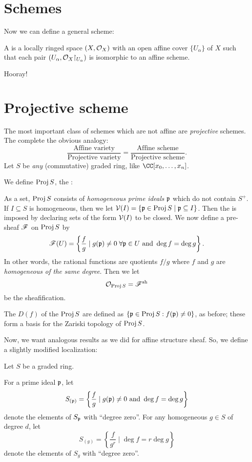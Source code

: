 \documentclass[11pt]{scrreprt}
\begin{document}
\section{Schemes}
Now we can define a general scheme:
\begin{definition}
	A  is a locally ringed space $(X, \mathcal O_X)$
	with an open affine cover $\{U_\alpha\}$ of $X$
	such that each pair $(U_\alpha, \OO_X \restrict{U_\alpha})$
	is isomorphic to an affine scheme.
\end{definition}
Hooray!

\section{Projective scheme}
The most important class of schemes which are not affine are
\emph{projective} schemes.
The complete the obvious analogy:
\[
	\frac{\text{Affine variety}}{\text{Projective variety}}
	= 
	\frac{\text{Affine scheme}}{\text{Projective scheme}}.
\]
Let $S$ be \emph{any} (commutative) graded ring, like $\CC[x_0, \dots, x_n]$.
\begin{definition}
	We define $\operatorname{Proj} S$, the :
	\begin{itemize}
		\ii As a set, $\operatorname{Proj} S$ consists of \emph{homogeneous prime ideals}
		$\mathfrak p$ which do not contain $S^+$.
		\ii If $I \subseteq S$ is homogeneous, then
		we let $\mathcal V(I) = \{ \mathfrak p \in \operatorname{Proj} S \mid \mathfrak p \subseteq I \}$.
		Then the  is imposed by declaring 
		sets of the form $\mathcal V(I)$ to be closed.
		\ii We now define a pre-sheaf $\mathscr F$ on $\operatorname{Proj} S$ by
		\[ \mathscr F(U) = 
			\left\{ \frac{f}{g} \mid 
			g(\mathfrak p) \neq 0 \; \forall \mathfrak p \in U \text{ and }
			\deg f = \deg g \right\}.
		\]
		In other words, the rational functions are quotients $f/g$
		where $f$ and $g$ are \emph{homogeneous of the same degree}.
		Then we let \[ \mathcal O_{\operatorname{Proj} S} = \mathscr F^\mathrm{sh} \] be the sheafification.
	\end{itemize}
\end{definition}
\begin{definition}
	The  $D(f)$ of the $\operatorname{Proj} S$
	are defined as $\left\{ \mathfrak p \in \operatorname{Proj} S : f(\mathfrak p) \neq 0 \right\}$,
	as before; these form a basis for the Zariski topology of $\operatorname{Proj} S$.
\end{definition}
Now, we want analogous results as we did for affine structure sheaf.
So, we define a slightly modified localization:
\begin{definition}
	Let $S$ be a graded ring.
	\begin{enumerate}[(i)]
		\ii For a prime ideal $\mathfrak p$, let
		\[ S_{(\mathfrak p)} = \left\{ \frac fg \mid g(\mathfrak p) \neq 0 \text{ and }
			\deg f = \deg g \right\} \]
		denote the elements of $S_\mathfrak p$ with ``degree zero''.
		\ii For any homogeneous $g \in S$ of degree $d$, let
		\[ S_{(g)} = \left\{ \frac{f}{g^r} \mid 
			\deg f = r \deg g \right\} \]
		denote the elements of $S_g$ with ``degree zero''.
	\end{enumerate}
\end{definition}
\end{document}
